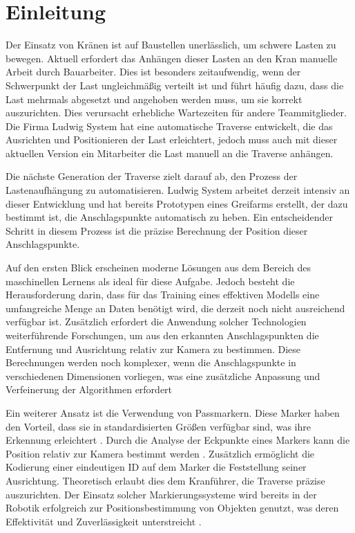 \section{Einleitung}

Der Einsatz von Kränen ist auf Baustellen unerlässlich, um schwere Lasten zu bewegen. Aktuell erfordert das Anhängen dieser Lasten an den Kran manuelle Arbeit durch Bauarbeiter. Dies ist besonders zeitaufwendig, wenn der Schwerpunkt der Last ungleichmäßig verteilt ist und führt häufig dazu, dass die Last mehrmals abgesetzt und angehoben werden muss, um sie korrekt auszurichten. Dies verursacht erhebliche Wartezeiten für andere Teammitglieder. Die Firma Ludwig System hat eine automatische Traverse entwickelt, die das Ausrichten und Positionieren der Last erleichtert, jedoch muss auch mit dieser aktuellen Version ein Mitarbeiter die Last manuell an die Traverse anhängen.

Die nächste Generation der Traverse zielt darauf ab, den Prozess der Lastenaufhängung zu automatisieren. Ludwig System arbeitet derzeit intensiv an dieser Entwicklung und hat bereits Prototypen eines Greifarms erstellt, der dazu bestimmt ist, die Anschlagspunkte automatisch zu heben. Ein entscheidender Schritt in diesem Prozess ist die präzise Berechnung der Position dieser Anschlagspunkte.

Auf den ersten Blick erscheinen moderne Lösungen aus dem Bereich des maschinellen Lernens als ideal für diese Aufgabe. Jedoch besteht die Herausforderung darin, dass für das Training eines effektiven Modells eine umfangreiche Menge an Daten benötigt wird, die derzeit noch nicht ausreichend verfügbar ist. Zusätzlich erfordert die Anwendung solcher Technologien weiterführende Forschungen, um aus den erkannten Anschlagspunkten die Entfernung und Ausrichtung relativ zur Kamera zu bestimmen. Diese Berechnungen werden noch komplexer, wenn die Anschlagspunkte in verschiedenen Dimensionen vorliegen, was eine zusätzliche Anpassung und Verfeinerung der Algorithmen erfordert

Ein weiterer Ansatz ist die Verwendung von Passmarkern. Diese Marker haben den Vorteil, dass sie in standardisierten Größen verfügbar sind, was ihre Erkennung erleichtert \cite{astrobee2023}. Durch die Analyse der Eckpunkte eines Markers kann die Position relativ zur Kamera bestimmt werden \cite{localizationSystem}. Zusätzlich ermöglicht die Kodierung einer eindeutigen ID auf dem Marker die Feststellung seiner Ausrichtung. Theoretisch erlaubt dies dem Kranführer, die Traverse präzise auszurichten. Der Einsatz solcher Markierungssysteme wird bereits in der Robotik erfolgreich zur Positionsbestimmung von Objekten genutzt, was deren Effektivität und Zuverlässigkeit unterstreicht \cite{localizationSystem}.


